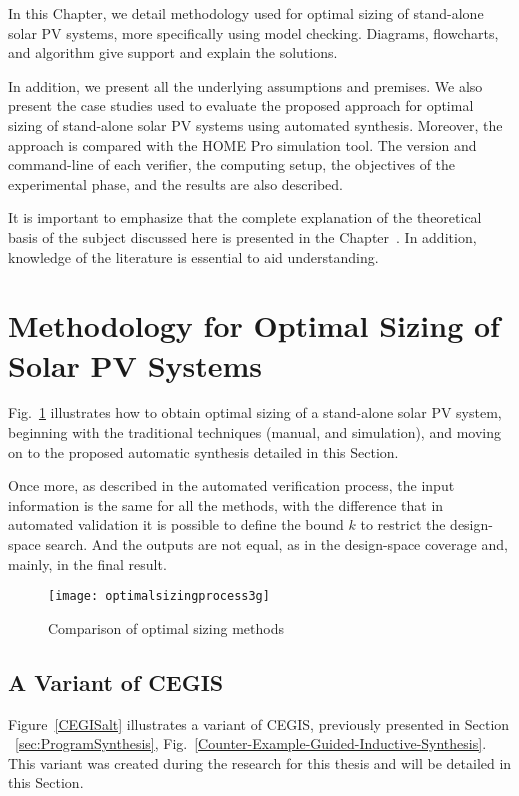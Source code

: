 In this Chapter, we detail methodology used for optimal sizing of stand-alone solar PV systems, more specifically using model checking. Diagrams, flowcharts, and algorithm give support and explain the solutions.

In addition, we present all the underlying assumptions and premises. We also present the case studies used to evaluate the proposed approach for optimal sizing of stand-alone solar PV systems using automated synthesis. Moreover, the approach is compared with the HOME Pro simulation tool. The version and command-line of each verifier, the computing setup, the objectives of the experimental phase, and the results are also described.

It is important to emphasize that the complete explanation of the theoretical basis of the subject discussed here is presented in the Chapter~. In addition, knowledge of the literature is essential to aid understanding.

\section{Methodology for Optimal Sizing of Solar PV Systems}

Fig.~\ref{fig:optimization} illustrates how to obtain optimal sizing of a stand-alone solar PV system, beginning with the traditional techniques (manual, and simulation), and moving on to the proposed automatic synthesis detailed in this Section. 

Once more, as described in the automated verification process, the input information is the same for all the methods, with the difference that in automated validation it is possible to define the bound $k$ to restrict the design-space search. And the outputs are not equal, as in the design-space coverage and, mainly, in the final result.

\begin{figure}[h]
\texttt{[image: optimalsizingprocess3g]}
\centering
\caption{Comparison of optimal sizing methods}
\label{fig:optimization}
\end{figure}
 
\subsection{A Variant of CEGIS} 

Figure~\ref{CEGISalt} illustrates a variant of CEGIS, previously presented in Section ~\ref{sec:ProgramSynthesis}, Fig.~\ref{Counter-Example-Guided-Inductive-Synthesis}. This variant was created during the research for this thesis and will be detailed in this Section.

